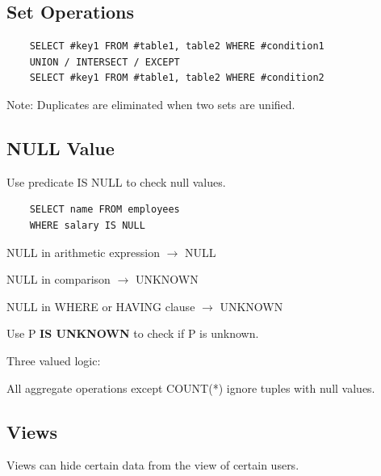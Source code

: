 \documentclass[11pt,a4paper]{article}
\begin{document}


\subsection{Set Operations}
\begin{lstlisting}
    SELECT #key1 FROM #table1, table2 WHERE #condition1
    UNION / INTERSECT / EXCEPT 
    SELECT #key1 FROM #table1, table2 WHERE #condition2
\end{lstlisting}
Note: Duplicates are eliminated when two sets are unified.

\subsection{NULL Value}
Use predicate IS NULL to check null values.
\begin{lstlisting}
    SELECT name FROM employees 
    WHERE salary IS NULL
\end{lstlisting}
NULL in arithmetic expression $\rightarrow$ NULL \par
NULL in comparison $\rightarrow$ UNKNOWN \par
NULL in WHERE or HAVING clause $\rightarrow$ UNKNOWN \par
Use P \textbf{IS UNKNOWN} to check if P is unknown. \par

Three valued logic: \par
{}

All aggregate operations except COUNT(*) ignore tuples with null values.

\subsection{Views}
Views can hide certain data from the view of certain users.
\end{document}
